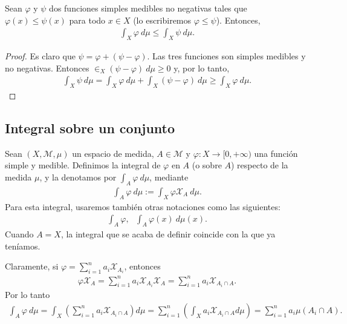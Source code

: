 \begin{prop}
    Sean $\varphi$ y $\psi$ dos funciones simples medibles no negativas tales que $\varphi(x) \leq \psi(x)$ para todo $x \in X$ (lo escribiremos $\varphi \leq \psi$). Entonces,
    \begin{align*}
        \int_{X}{\varphi \ d\mu} \leq \int_{X}{\psi \ d\mu}.
    \end{align*}
\end{prop}

\begin{proof}
    Es claro que $\psi = \varphi + (\psi - \varphi)$. Las tres funciones son simples medibles y no negativas. Entonces $\in_{X}{(\psi - \varphi) \ d\mu} \ge 0$ y, por lo tanto,
    \begin{align*}
        \int_{X}{\psi \ d\mu} = \int_{X}{\varphi \ d\mu} + \int_{X}{(\psi - \varphi) \ d\mu} \ge \int_{X}{\varphi \ d\mu}.
    \end{align*}
\end{proof}

\subsection{Integral sobre un conjunto}

\begin{defi}
    Sean $(X, \mathcal{M}, \mu)$ un espacio de medida, $A \in \mathcal{M}$ y $\varphi: X \longrightarrow [0, +\infty)$ una función simple y medible. Definimos la integral de $\varphi$ en $A$ (o sobre $A$) respecto de la medida $\mu$, y la denotamos por $\int_{A}{\varphi \ d\mu}$, mediante
    \begin{align*}
        \int_{A}{\varphi \ d\mu} := \int_{X}{\varphi \mathcal{X}_A \ d\mu}.
    \end{align*}
    Para esta integral, usaremos también otras notaciones como las siguientes:
    \begin{align*}
        \int_{A}{\varphi}, \ \ \ \int_{A}{\varphi(x) \ d\mu(x)}.
    \end{align*}
    Cuando $A = X$, la integral que se acaba de definir coincide con la que ya teníamos.
\end{defi}

Claramente, si $\varphi = \sum_{i=1}^{n}{a_i \mathcal{X}_{A_i}}$, entonces
\begin{align*}
    \varphi \mathcal{X}_A = \sum_{i=1}^{n}{a_i \mathcal{X}_{A_i} \mathcal{X}_A} = \sum_{i=1}^{n}{a_i \mathcal{X}_{A_i \cap A}}.
\end{align*}
Por lo tanto
\begin{align*}
    \int_{A}{\varphi \ d\mu} = \int_{X}{\left( \sum_{i=1}^{n}{a_i \mathcal{X}_{A_i \cap A}} \right) d\mu} =  \sum_{i=1}^{n}{\left( \int_{X}{a_i \mathcal{X}_{A_i \cap A} d\mu}\right)} =  \sum_{i=1}^{n}{a_i\mu(A_i\cap A)}.
\end{align*}

